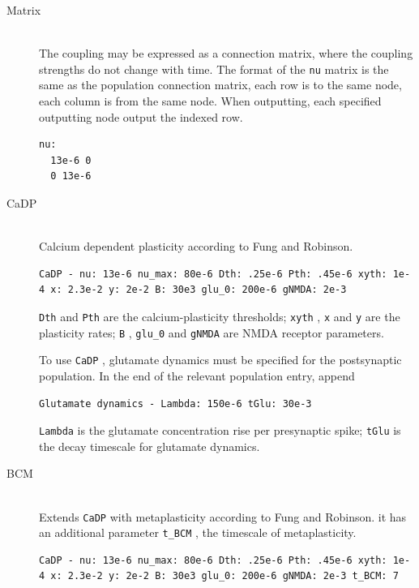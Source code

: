 \documentclass[12pt,a4paper]{article}
\newcommand{\type}[1]{{\small\small\tt #1} }
\begin{document}
\begin{itemize}
\begin{description}

    \item[Matrix]\ \\

    The coupling may be expressed as a connection matrix, where the coupling
    strengths do not change with time. The format of the \texttt{nu} matrix is
    the same as the population connection matrix, each row is to the same
    node, each column is from the same node. When outputting, each specified
    outputting node output the indexed row.

    \begin{lstlisting}
nu:
  13e-6 0
  0 13e-6
    \end{lstlisting}

    \item[CaDP]\ \\
    Calcium dependent plasticity according to Fung and Robinson.
    \begin{lstlisting}
CaDP - nu: 13e-6 nu_max: 80e-6 Dth: .25e-6 Pth: .45e-6 xyth: 1e-4 x: 2.3e-2 y: 2e-2 B: 30e3 glu_0: 200e-6 gNMDA: 2e-3
    \end{lstlisting}

    \type{Dth} and \type{Pth} are the calcium-plasticity thresholds; \type{xyth}, \type{x} and \type{y} are the plasticity rates; \type{B}, \type{glu\_0} and \type{gNMDA} are NMDA receptor parameters.

    To use \type{CaDP}, glutamate dynamics must be specified for the postsynaptic population. In the end of the relevant population entry, append
    \begin{lstlisting}
Glutamate dynamics - Lambda: 150e-6 tGlu: 30e-3
    \end{lstlisting}
    \type{Lambda} is the glutamate concentration rise per presynaptic spike; \type{tGlu} is the decay timescale for glutamate dynamics.

    \item[BCM]\ \\
    Extends \type{CaDP} with metaplasticity according to Fung and Robinson. it has an additional parameter \type{t\_BCM}, the timescale of metaplasticity.
    \begin{lstlisting}
CaDP - nu: 13e-6 nu_max: 80e-6 Dth: .25e-6 Pth: .45e-6 xyth: 1e-4 x: 2.3e-2 y: 2e-2 B: 30e3 glu_0: 200e-6 gNMDA: 2e-3 t_BCM: 7
    \end{lstlisting}


\end{description}
\end{itemize}
\end{document}
